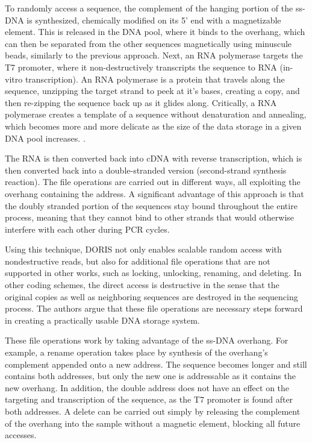 \documentclass[a4paper,conference]{IEEEtran}
\begin{document}
To randomly access a sequence, the complement of the hanging portion of the ss-DNA is synthesized, chemically modified on its 5' end with a magnetizable element. This is released in the DNA pool, where it binds to the overhang, which can then be separated from the other sequences magnetically using minuscule beads, similarly to the previous approach. Next, an RNA polymerase targets the T7 promoter, where it non-destructively transcripts the sequence to RNA (in-vitro transcription). An RNA polymerase is a protein that travels along the sequence, unzipping the target strand to peek at it's bases, creating a copy, and then re-zipping the sequence back up as it glides along. Critically, a RNA polymerase creates a template of a sequence without denaturation and annealing, which becomes more and more delicate as the size of the data storage in a given DNA pool increases. \cite{}.

The RNA is then converted back into cDNA with reverse transcription, which is then converted back into a double-stranded version (second-strand synthesis reaction). The file operations are carried out in different ways, all exploiting the overhang containing the address. A significant advantage of this approach is that the doubly stranded portion of the sequences stay bound throughout the entire process, meaning that they cannot bind to other strands that would otherwise interfere with each other during PCR cycles.

Using this technique, DORIS not only enables scalable random access with nondestructive reads, but also for additional file operations that are not supported in other works, such as locking, unlocking, renaming, and deleting. In other coding schemes, the direct access is destructive in the sense that the original copies as well as neighboring sequences are destroyed in the sequencing process. The authors argue that these file operations are necessary steps forward in creating a practically usable DNA storage system.

These file operations work by taking advantage of the ss-DNA overhang. For example, a rename operation takes place by synthesis of the overhang's complement appended onto a new address. The sequence becomes longer and still contains both addresses, but only the new one is addressable as it contains the new overhang. In addition, the double address does not have an effect on the targeting and transcription of the sequence, as the T7 promoter is found after both addresses. A delete can be carried out simply by releasing the complement of the overhang into the sample without a magnetic element, blocking all future accesses.
\end{document}
